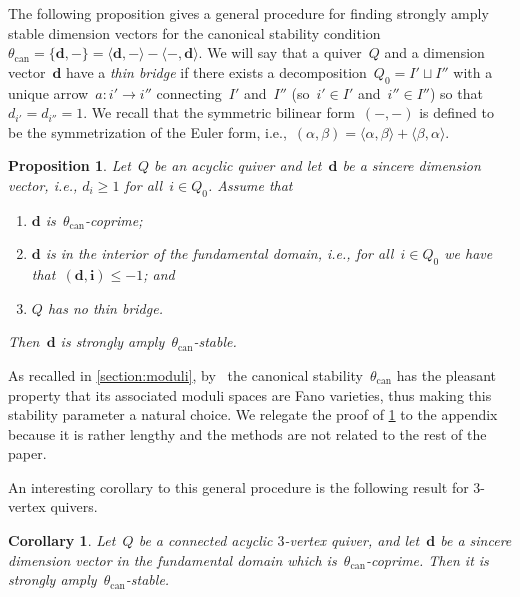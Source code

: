 \documentclass[JEP,XML,SOM,Unicode,NoEqCountersInSection,published]{cedram}
\theoremstyle{plain}
\newtheorem{corollary}[theorem]{Corollary}
\newtheorem{proposition}[theorem]{Proposition}
\theoremstyle{definition}
\newcommand\can{\ensuremath{\mathrm{can}}}
\newcommand\tuple[1]{\ensuremath{{\boldsymbol{#1}}}}
\begin{document}
The following proposition gives a general procedure for
finding strongly amply stable dimension vectors
for the canonical stability condition~$\theta_\can=\{\tuple{d},-\}=\langle\tuple{d},-\rangle-\langle-,\tuple{d}\rangle$.
We will say that a quiver~$Q$ and a dimension vector~$\tuple{d}$
have a \emph{thin bridge}
if there exists a decomposition~$Q_0=I'\sqcup I''$
with a unique arrow~$a\colon i'\to i''$ connecting~$I'$ and~$I''$
(so~$i'\in I'$ and~$i''\in I''$)
so that~$d_{i'}=d_{i''}=1$.
We recall that the symmetric bilinear form~$(-,-)$ is defined to be
the symmetrization of the Euler form, i.e.,~$(\alpha,\beta) = \langle \alpha , \beta\rangle + \langle \beta,\alpha\rangle$.
\begin{proposition}
\label{proposition:strong-ample-stability-fundamental-domain}
Let~$Q$ be an acyclic quiver
and let~$\tuple{d}$ be a sincere dimension vector,
i.e., $d_i\geq 1$ for all~$i\in Q_0$.
Assume that
\begin{enumerate}
\item $\tuple{d}$ is~$\theta_\can$-coprime;
\item $\tuple{d}$ is in the interior of the fundamental domain,
i.e., for all~$i\in Q_0$ we have that~$(\tuple{d},\tuple{i})\leq -1$; and
\item $Q$ has no thin bridge.
\end{enumerate}
Then~$\tuple{d}$ is strongly amply~$\theta_\can$-stable.
\end{proposition}
As recalled in \cref{section:moduli}, by~\cite{MR4352662}
the canonical stability~$\theta_\can$ has the pleasant property
that its associated moduli spaces are Fano varieties,
thus making this stability parameter a natural choice.
We relegate the proof of \cref{proposition:strong-ample-stability-fundamental-domain}
to the appendix because it is rather lengthy
and the methods are not related to the rest of the paper.

An interesting corollary to this general procedure is the following result for $3$-vertex quivers.

\begin{corollary}
\label{corollary:hans}
Let~$Q$ be a connected acyclic $3$-vertex quiver,
and let~$\tuple{d}$ be a sincere dimension vector in the fundamental domain
which is~$\theta_\can$-coprime.
Then it is strongly amply~$\theta_\can$-stable.
\end{corollary}
\end{document}
